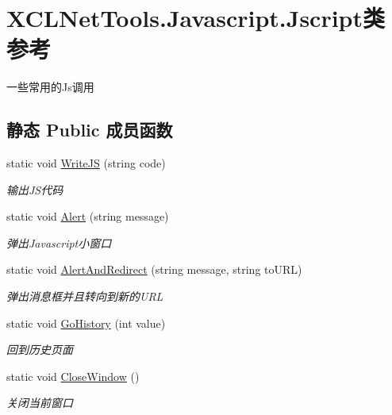 \hypertarget{class_x_c_l_net_tools_1_1_javascript_1_1_jscript}{\section{X\-C\-L\-Net\-Tools.\-Javascript.\-Jscript类 参考}
\label{class_x_c_l_net_tools_1_1_javascript_1_1_jscript}
}


一些常用的\-Js调用  


\subsection*{静态 Public 成员函数}
\begin{DoxyCompactItemize}
\item 
static void \hyperlink{class_x_c_l_net_tools_1_1_javascript_1_1_jscript_a7df1e096fb81b6148d1e89aa56cddc26}{Write\-J\-S} (string code)
\begin{DoxyCompactList}\small\item\em 输出\-J\-S代码 \end{DoxyCompactList}\item 
static void \hyperlink{class_x_c_l_net_tools_1_1_javascript_1_1_jscript_a8bb91a5a3ddf09a39443e7983f2e8ee2}{Alert} (string message)
\begin{DoxyCompactList}\small\item\em 弹出\-Javascript小窗口 \end{DoxyCompactList}\item 
static void \hyperlink{class_x_c_l_net_tools_1_1_javascript_1_1_jscript_a31b283197fe1f60b11830bea87352b95}{Alert\-And\-Redirect} (string message, string to\-U\-R\-L)
\begin{DoxyCompactList}\small\item\em 弹出消息框并且转向到新的\-U\-R\-L \end{DoxyCompactList}\item 
static void \hyperlink{class_x_c_l_net_tools_1_1_javascript_1_1_jscript_a794143737133270bc7c4860789a39713}{Go\-History} (int value)
\begin{DoxyCompactList}\small\item\em 回到历史页面 \end{DoxyCompactList}\item 
static void \hyperlink{class_x_c_l_net_tools_1_1_javascript_1_1_jscript_a3d75ebf33916a6e962f2964e03432fd5}{Close\-Window} ()
\begin{DoxyCompactList}\small\item\em 关闭当前窗口 \end{DoxyCompactList}\item 

\end{DoxyCompactItemize}
